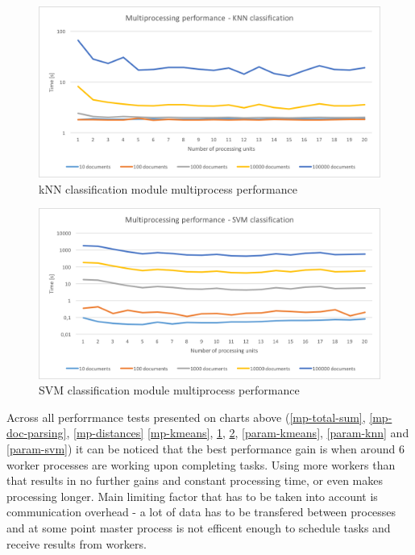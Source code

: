   \begin{figure}
\begin{center}
 \includegraphics[width=0.9\linewidth]{images/tests/mp-knn.png}
 \caption{ kNN classification module multiprocess performance}
 \label{mp-knn}
 \end{center}
 \end{figure}

\begin{figure}
\begin{center}
\includegraphics[width=0.9\linewidth]{images/tests/mp-svm.png}
\caption{SVM classification module multiprocess performance }
\label{mp-svm}
\end{center}
\end{figure}

Across all perforrmance tests presented on charts above (\ref{mp-total-sum}, \ref{mp-doc-parsing}, \ref{mp-distances} \ref{mp-kmeans}, \ref{mp-knn}, \ref{mp-svm}, \ref{param-kmeans}, \ref{param-knn} and \ref{param-svm}) it can be noticed that the best performance gain is when around 6 worker processes are working upon completing tasks. Using more workers than that results in no further gains and constant processing time, or even makes processing longer. Main limiting factor that has to be taken into account is communication overhead - a lot of data has to be transfered between processes and at some point master process is not efficent enough to schedule tasks and receive results from workers.

